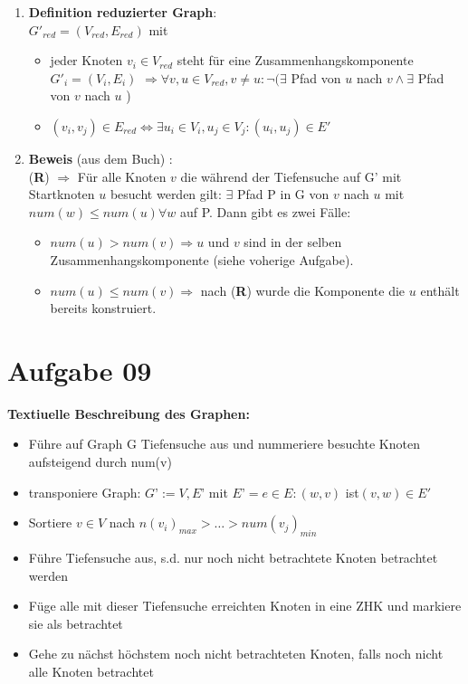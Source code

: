 \documentclass[10pt,a4paper]{article}
\begin{document}
	\begin{enumerate}[label={\alph*)}]

		\item
			\textbf{Definition reduzierter Graph}: \\
			$G'_{red} = (V_{red},E_{red})$ mit
			\begin{itemize}
				\item
					jeder Knoten $v_{i} \in V_{red}$ steht für eine
					Zusammenhangskomponente $G'_i=(V_i,E_i)$
					$\Rightarrow \forall v,u \in V_{red}, v \neq u : 
					\neg(\exists $ Pfad von $ u $ nach $v \wedge \exists $ Pfad von $v$ nach $u$ )
				\item
					$(v_i,v_j) \in E_{red} \Leftrightarrow \exists u_i \in V_i,
						u_j \in V_j: (u_i,u_j) \in E'$
			\end{itemize}

		\item
		\textbf{Beweis} (aus dem Buch) : \\
		(\textbf{R}) $\Rightarrow$ Für alle Knoten $v$ die während der Tiefensuche
			auf G' mit Startknoten $u$ besucht werden gilt: $\exists$ Pfad P in G von
			$v$ nach $u$ mit $num(w) \leq num(u) \forall w$ auf P. Dann gibt es zwei Fälle:
			\begin{itemize}
				\item
					$num(u) > num(v) \Rightarrow u$ und $v$ sind in der selben Zusammenhangskomponente
					(siehe voherige Aufgabe).
				\item
					$num(u) \leq num(v) \Rightarrow $ nach (\textbf{R}) wurde die Komponente
						die $u$ enthält bereits konstruiert.
			\end{itemize}

	\end{enumerate}
	

\section*{Aufgabe 09}

    \textbf{Textiuelle Beschreibung des Graphen:} \\
    
    \begin{itemize}
        \item Führe auf Graph G Tiefensuche aus und nummeriere besuchte Knoten aufsteigend durch num(v)
        \item transponiere Graph: $G’ := V, E’$ mit $E’ = e \in E :(w,v)$ ist$ (v,w) \in E'$
        \item Sortiere $v \in V$ nach $n(v_i)_{max}>\ldots>num(v_j)_{min}$
        \item Führe Tiefensuche aus, s.d. nur noch nicht betrachtete Knoten betrachtet werden
        \item Füge alle mit dieser Tiefensuche erreichten Knoten in eine ZHK und markiere sie als betrachtet
        \item Gehe zu nächst höchstem noch nicht betrachteten Knoten, falls noch nicht alle Knoten betrachtet
        
    \end{itemize}
\end{document}
